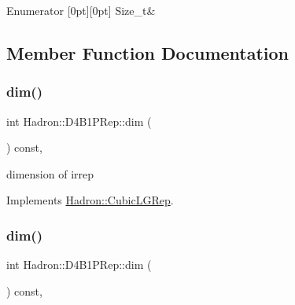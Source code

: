 \begin{DoxyEnumFields}{Enumerator}
[0pt][0pt]{}\mbox{\label{structHadron_1_1D4B1PRep_a1eade57fad6d0456eb9c846f796ac3ffa604afccb8b528ebb2c52b9db177a4cbc}} 
Size\+\_\+t&\\
\hline

\end{DoxyEnumFields}


\subsection{Member Function Documentation}
\mbox{\label{structHadron_1_1D4B1PRep_aec9a69d79952beffdb9f4816ce097f30}} 
\subsubsection{\texorpdfstring{dim()}{dim()}\hspace{0.1cm}{\footnotesize\ttfamily [1/3]}}
{\footnotesize\ttfamily int Hadron\+::\+D4\+B1\+P\+Rep\+::dim (\begin{DoxyParamCaption}{ }\end{DoxyParamCaption}) const\hspace{0.3cm}{\ttfamily [inline]}, {\ttfamily [virtual]}}

dimension of irrep 

Implements \mbox{\hyperlink{structHadron_1_1CubicLGRep_a3acbaea26503ed64f20df693a48e4cdd}{Hadron\+::\+Cubic\+L\+G\+Rep}}.

\mbox{\label{structHadron_1_1D4B1PRep_aec9a69d79952beffdb9f4816ce097f30}} 
\subsubsection{\texorpdfstring{dim()}{dim()}\hspace{0.1cm}{\footnotesize\ttfamily [2/3]}}
{\footnotesize\ttfamily int Hadron\+::\+D4\+B1\+P\+Rep\+::dim (\begin{DoxyParamCaption}{ }\end{DoxyParamCaption}) const\hspace{0.3cm}{\ttfamily [inline]}, {\ttfamily [virtual]}}

